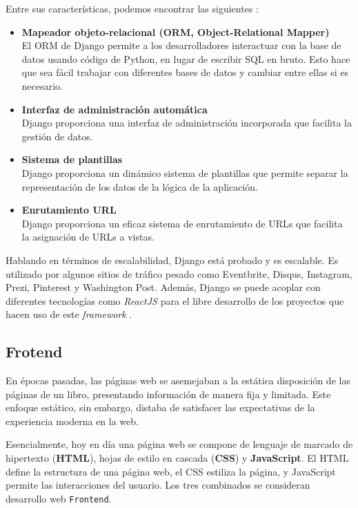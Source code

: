 Entre sus características, podemos encontrar las siguientes \cite{django}:
\begin{itemize}
    \item \textbf{Mapeador objeto-relacional (ORM, Object-Relational Mapper)}\\
    El ORM de Django permite a los desarrolladores interactuar con la base de datos usando código de Python, en lugar de escribir SQL en bruto. Esto hace que sea fácil trabajar con diferentes bases de datos y cambiar entre ellas si es necesario.

    \item \textbf{Interfaz de administración automática} \\
    Django proporciona una interfaz de administración incorporada que facilita la gestión de datos.
    
    \item \textbf{Sistema de plantillas}\\
    Django proporciona un dinámico sistema de plantillas que permite separar la representación de los datos de la lógica de la aplicación.

    \item \textbf{Enrutamiento URL}\\
    Django proporciona un eficaz sistema de enrutamiento de URLs que facilita la asignación de URLs a vistas.
    
\end{itemize}

Hablando en términos de escalabilidad, Django está probado y es escalable. Es utilizado por algunos sitios de tráfico pesado como Eventbrite, Disqus, Instagram, Prezi, Pinterest y Washington Post. Además, Django se puede acoplar con diferentes tecnologías como \textit{ReactJS} para el libre desarrollo de los proyectos que hacen uso de este \textit{framework} \cite{gagliardi2021decoupled}.

\subsection{Frotend}

En épocas pasadas, las páginas web se asemejaban a la estática disposición de las páginas de un libro, presentando información de manera fija y limitada. Este enfoque estático, sin embargo, distaba de satisfacer las expectativas de la experiencia moderna en la web.

Esencialmente, hoy en día una página web se compone de lenguaje de marcado de hipertexto (\textbf{HTML}), hojas de estilo en cascada (\textbf{CSS}) y \textbf{JavaScript}. El HTML define la estructura de una página web, el CSS estiliza la página, y JavaScript permite las interacciones del usuario. Los tres combinados se consideran desarrollo web \texttt{Frontend}.

